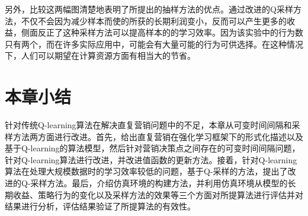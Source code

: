 另外，比较这两幅图清楚地表明了所提出的抽样方法的优点。通过改进的Q采样方法，不仅不会因为减少样本而使的所获的长期利润变小，反而可以产生更多的收益，侧面反正了这种采样方法可以提高样本的的学习效率。因为该实验中的行为数只有两个，而在许多实际应用中，可能会有大量可能的行为可供选择。在这种情况下，人们可以期望在计算资源方面有相当大的节省。

\section{本章小结}
针对传统Q-learning算法在解决直复营销问题中的不足，本章从可变时间间隔和采样方法两方面进行改进。首先，给出直复营销在强化学习框架下的形式化描述以及基于Q-learning的算法模型，然后针对营销决策点之间存在的可变时间间隔问题，针对Q-learning算法进行改进，并改进值函数的更新方法。接着，针对Q-learning算法在处理大规模数据时的学习效率较低的问题，基于Q-采样的方法，提出了改进的Q-采样方法。最后，介绍仿真环境的构建方法，并利用仿真环境从模型的长期收益、策略行为的变化以及采样方法的效果等三个方面对所提算法进行评估并对结果进行分析，评估结果验证了所提算法的有效性。

